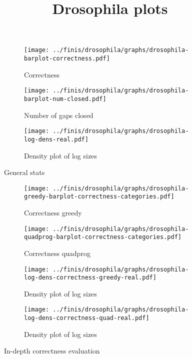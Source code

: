 \documentclass[12pt]{amsart}
\begin{document}
\title{Drosophila plots}

\maketitle

\newpage
\begin{figure}[h!]
  \centering

    \begin{subfigure}{230pt}
    \centering
      \texttt{[image: ../finis/drosophila/graphs/drosophila-barplot-correctness.pdf]}
      \caption{Correctness}
    \end{subfigure}%
    \begin{subfigure}{230pt}
      \texttt{[image: ../finis/drosophila/graphs/drosophila-barplot-num-closed.pdf]}
      \caption{Number of gaps closed}
    \end{subfigure}

    \begin{subfigure}{400pt}
      \texttt{[image: ../finis/drosophila/graphs/drosophila-log-dens-real.pdf]}
      \caption{Density plot of log sizes}
    \end{subfigure}    

  \caption{General stats}
\end{figure}

\begin{figure}[h!]
  \centering

    \begin{subfigure}{230pt}
    \centering
      \texttt{[image: ../finis/drosophila/graphs/drosophila-greedy-barplot-correctness-categories.pdf]}
      \caption{Correctness greedy}
    \end{subfigure}%
    \begin{subfigure}{230pt}
      \texttt{[image: ../finis/drosophila/graphs/drosophila-quadprog-barplot-correctness-categories.pdf]}
      \caption{Correctness quadprog}
    \end{subfigure}

    \begin{subfigure}{230pt}
      \texttt{[image: ../finis/drosophila/graphs/drosophila-log-dens-correctness-greedy-real.pdf]}
      \caption{Density plot of log sizes}
    \end{subfigure}%
    \begin{subfigure}{230pt}
      \texttt{[image: ../finis/drosophila/graphs/drosophila-log-dens-correctness-quad-real.pdf]}
      \caption{Density plot of log sizes}
    \end{subfigure}    

  \caption{In-depth correctness evaluation}
\end{figure}
\end{document}
